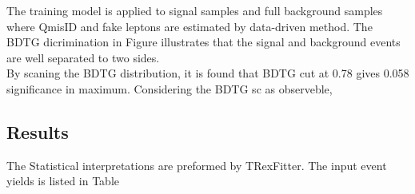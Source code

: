 The training model is applied to signal samples and full background samples where QmisID and fake leptons are estimated by data-driven method. The BDTG dicrimination in Figure illustrates that the signal and background events are well separated to two sides.\\
By scaning the BDTG distribution, it is found that BDTG cut at 0.78 gives 0.058 significance in maximum. Considering the BDTG sc as observeble, 
\subsection{Results}
The Statistical interpretations are preformed by TRexFitter. The input event yields is listed in Table

